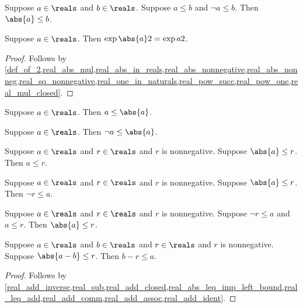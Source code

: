 \begin{proposition}\label{real_abs_leq_if_pm_leq}
    Suppose $a\in\reals$ and $b\in\reals$.
    Suppose $a \leq b$ and $\neg{a} \leq b$.
    Then $\abs{a} \leq b$.
\end{proposition}

\begin{proposition}\label{real_abs_square}
    Suppose $a\in\reals$.
    Then $\exp{\abs{a}}{2} = \exp{a}{2}$.
\end{proposition}
\begin{proof}
    Follows by \cref{def_of_2,real_abs_mul,real_abs_in_reals,real_abs_nonnegative,real_abs_nonneg,real_sq_nonnegative,real_one_in_naturals,real_pow_succ,real_pow_one,real_mul_closed}.
\end{proof}

\begin{proposition}\label{real_leq_abs}
    Suppose $a\in\reals$.
    Then $a \leq \abs{a}$.
\end{proposition}

\begin{proposition}\label{real_neg_leq_abs}
    Suppose $a\in\reals$.
    Then $\neg{a} \leq \abs{a}$.
\end{proposition}

\begin{proposition}\label{real_abs_leq_imp_right_bound}
    Suppose $a\in\reals$ and $r\in\reals$ and $r$ is nonnegative.
    Suppose $\abs{a} \leq r$.
    Then $a \leq r$.
\end{proposition}

\begin{proposition}\label{real_abs_leq_imp_left_bound}
    Suppose $a\in\reals$ and $r\in\reals$ and $r$ is nonnegative.
    Suppose $\abs{a} \leq r$.
    Then $\neg{r} \leq a$.
\end{proposition}

\begin{proposition}\label{real_abs_leq_from_bounds}
    Suppose $a\in\reals$ and $r\in\reals$ and $r$ is nonnegative.
    Suppose $\neg{r} \leq a$ and $a \leq r$.
    Then $\abs{a} \leq r$.
\end{proposition}

\begin{proposition}\label{real_abs_sub_leq_imp_left_bound}
    Suppose $a\in\reals$ and $b\in\reals$ and $r\in\reals$ and $r$ is nonnegative.
    Suppose $\abs{a - b} \leq r$.
    Then $b - r \leq a$.
\end{proposition}
\begin{proof}
    Follows by \cref{real_add_inverse,real_sub,real_add_closed,real_abs_leq_imp_left_bound,real_leq_add,real_add_comm,real_add_assoc,real_add_ident}.
\end{proof}

